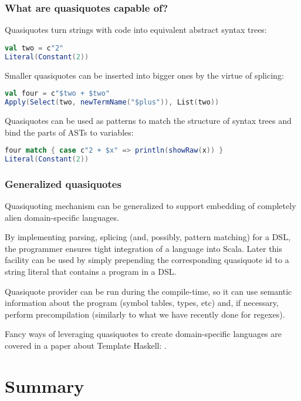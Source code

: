 \documentclass[hyperref={bookmarks=false}]{beamer}
\begin{document}
\begin{frame}[t,fragile]
\frametitle{What are quasiquotes capable of?}

Quasiquotes turn strings with code into equivalent abstract syntax trees:

\begin{lstlisting}[language=scala]
val two = c"2"
Literal(Constant(2))
\end{lstlisting}

Smaller quasiquotes can be inserted into bigger ones by the virtue of splicing:

\begin{lstlisting}[language=scala]
val four = c"$two + $two"
Apply(Select(two, newTermName("$plus")), List(two))
\end{lstlisting}%

Quasiquotes can be used as patterns to match the structure of syntax trees and bind the parts of ASTs to variables:

\begin{lstlisting}[language=scala]
four match { case c"2 + $x" => println(showRaw(x)) }
Literal(Constant(2))
\end{lstlisting}%
\end{frame}

\begin{frame}[t,fragile]
\frametitle{Generalized quasiquotes}
Quasiquoting mechanism can be generalized to support embedding of completely alien domain-specific languages.

By implementing parsing, splicing (and, possibly, pattern matching) for a DSL, the programmer ensures tight integration of a language into Scala. Later this facility can be used by simply prepending the corresponding quasiquote id to a string literal that contains a program in a DSL.

Quasiquote provider can be run during the compile-time, so it can use semantic information about the program (symbol tables, types, etc) and, if necessary, perform precompilation (similarly to what we have recently done for regexes).

Fancy ways of leveraging quasiquotes to create domain-specific languages are covered in a paper about Template Haskell: .

\end{frame}

\section{Summary}
\end{document}
